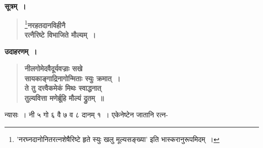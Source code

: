 \documentclass[11pt, openany]{book}
\begin{document}
\begin{sloppypar}
\noindent \textbf{सूत्रम्~।}

 \label{2.27.1}
\begin{quote}
\renewcommand{\thefootnote}{१}\footnote{{\color{violet}'नरघ्नदानोनितरत्नशेषैरिष्टे हृते स्युः खलु मूल्यसङ्ख्या'} इति {\color{violet}भास्करा}नुरूपमिदम्~।}{\large \textbf{{\color{purple}नरहतदानविहीनै \\
रत्नैरिष्टे विभाजिते मौल्यम्~।}}}
\end{quote}

\noindent \textbf{उदाहरणम्~।}

 \label{Ex 2.32}
\begin{quote}
\textbf{{\color{red}नीलगोमेदवैदूर्यवज्राः सखे \\
सायकाङ्गाद्रिनागोन्मिताः स्युः क्रमात्~।\\
ते तु दत्त्वैकमेकं मिथः स्वाद्धनात् \\
तुल्यवित्ता मणेर्ब्रूहि मौल्यं द्रुतम्~॥}}
\end{quote}

न्यासः~। नी ५ गो ६ वै ७ व ८ दानम् १~। एकेनेष्टेन जातानि रत्न-
\end{sloppypar}

\newpage
\end{document}
